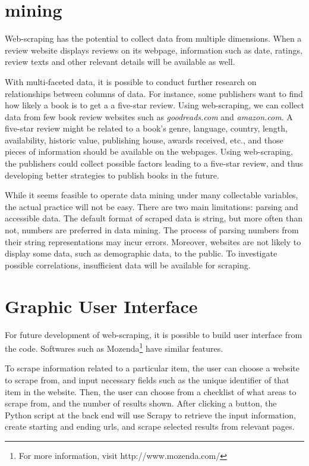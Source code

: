 \documentclass[12pt,twoside,draft]{report}
\begin{document}
\section{\gls{mining}}

Web-scraping has the potential to collect data from multiple dimensions. When a review website displays reviews on its webpage, information such as date, ratings, review texts and other relevant details will be available as well. 

With multi-faceted data, it is possible to conduct further research on relationships between columns of data. For instance, some publishers want to find how likely a book is to get a a five-star review. Using web-scraping, we can collect data from few book review websites such as \textit{goodreads.com} and \textit{amazon.com}. A five-star review might be related to a book's genre, language, country, length, availability, historic value, publishing house, awards received, etc., and those pieces of information should be available on the webpages. Using web-scraping, the publishers could collect possible factors leading to a five-star review, and thus developing better strategies to publish books in the future.

While it seems feasible to operate data mining under many collectable variables, the actual practice will not be easy. There are two main limitations: parsing and accessible data. The default format of scraped data is string, but more often than not, numbers are preferred in data mining. The process of parsing numbers from their string representations may incur errors. Moreover, websites are not likely to display some data, such as demographic data, to the public. To investigate possible correlations, insufficient data will be available for scraping.


\section{Graphic User Interface}

For future development of web-scraping, it is possible to build user interface from the code. Softwares such as Mozenda\footnote{For more information, visit http://www.mozenda.com/} have similar features.

To scrape information related to a particular item, the user can choose a website to scrape from, and input necessary fields such as the unique identifier of that item in the website. Then, the user can choose from a checklist of what areas to scrape from, and the number of results shown. After clicking a button, the Python script at the back end will use Scrapy to retrieve the input information, create starting and ending urls, and scrape selected results from relevant pages.
\end{document}
